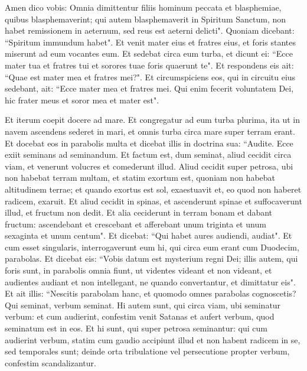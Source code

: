 \begin{biblechapter}
\verse Amen dico vobis: Omnia dimittentur filiis hominum peccata et blasphemiae, quibus blasphemaverint;  
\verse qui autem blasphemaverit in Spiritum Sanctum, non habet remissionem in aeternum, sed reus est aeterni delicti". 
\verse Quoniam dicebant: “Spiritum immundum habet". 
\verse Et venit mater eius et fratres eius, et foris stantes miserunt ad eum vocantes eum. 
\verse Et sedebat circa eum turba, et dicunt ei: “Ecce mater tua et fratres tui et sorores tuae foris quaerunt te". 
\verse Et respondens eis ait: “Quae est mater mea et fratres mei?". 
\verse Et circumspiciens eos, qui in circuitu eius sedebant, ait: “Ecce mater mea et fratres mei. 
\verse Qui enim fecerit voluntatem Dei, hic frater meus et soror mea et mater est". 
\end{biblechapter}

\begin{biblechapter}  
\verse Et iterum coepit docere ad mare. Et congregatur ad eum turba plurima, ita ut in navem ascendens sederet in mari, et omnis turba circa mare super terram erant. 
\verse Et docebat eos in parabolis multa et dicebat illis in doctrina sua: 
\verse “Audite. Ecce exiit seminans ad seminandum. 
\verse Et factum est, dum seminat, aliud cecidit circa viam, et venerunt volucres et comederunt illud. 
\verse Aliud cecidit super petrosa, ubi non habebat terram multam, et statim exortum est, quoniam non habebat altitudinem terrae; 
\verse et quando exortus est sol, exaestuavit et, eo quod non haberet radicem, exaruit. 
\verse Et aliud cecidit in spinas, et ascenderunt spinae et suffocaverunt illud, et fructum non dedit. 
\verse Et alia ceciderunt in terram bonam et dabant fructum: ascendebant et crescebant et afferebant unum triginta et unum sexaginta et unum centum". 
\verse Et dicebat: “Qui habet aures audiendi, audiat". 
\verse Et cum esset singularis, interrogaverunt eum hi, qui circa eum erant cum Duodecim, parabolas. 
\verse Et dicebat eis: “Vobis datum est mysterium regni Dei; illis autem, qui foris sunt, in parabolis omnia fiunt, 
\verse ut videntes videant et non videant, et audientes audiant et non intellegant, ne quando convertantur, et dimittatur eis". 
\verse Et ait illis: “Nescitis parabolam hanc, et quomodo omnes parabolas cognoscetis? 
\verse Qui seminat, verbum seminat. 
\verse Hi autem sunt, qui circa viam, ubi seminatur verbum: et cum audierint, confestim venit Satanas et aufert verbum, quod seminatum est in eos. 
\verse Et hi sunt, qui super petrosa seminantur: qui cum audierint verbum, statim cum gaudio accipiunt illud 
\verse et non habent radicem in se, sed temporales sunt; deinde orta tribulatione vel persecutione propter verbum, confestim scandalizantur. 

\end{biblechapter}
